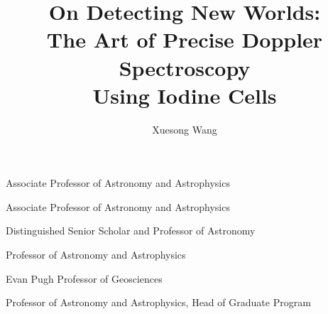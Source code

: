 \documentclass[11pt]{psuthesis}
\begin{document}
\title{On Detecting New Worlds: \\
  The Art of Precise Doppler Spectroscopy \\
  Using Iodine Cells}
\author{Xuesong Wang}


\begin{singlespace}

        {Associate Professor of Astronomy and Astrophysics}

          {Associate Professor of Astronomy and Astrophysics}

          {Distinguished Senior Scholar and Professor of Astronomy}

            {Professor of Astronomy and Astrophysics}

           {Evan Pugh Professor of Geosciences}

           {Professor of Astronomy and Astrophysics, Head of Graduate Program}

\begin{frontmatter}


\begin{doublespace}

\frontmatter
\psutitlepage
\psucommitteepage
{}
\thesistableofcontents
\thesislistoffigures
\thesislistoftables
\end{doublespace}


\clearpage
{}
\end{frontmatter}

\thesismainmatter
\allowdisplaybreaks{








}


\backmatter



\pagebreak
{}
\end{singlespace}
\end{document}
